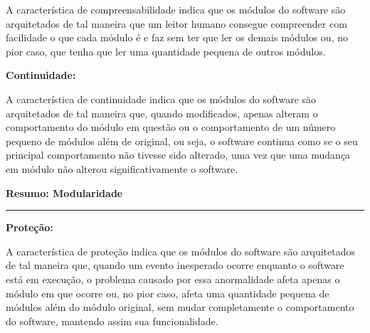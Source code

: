 \documentclass{article}
\begin{document}
\medskip

A característica de compreensabilidade indica que os módulos do software são arquitetados de tal maneira que um leitor humano consegue compreender com facilidade o que cada módulo é e faz sem ter que ler os demais módulos ou, no pior caso, que tenha que ler uma quantidade pequena de outros módulos.

\medskip

\textbf{Continuidade:}

\medskip

A característica de continuidade indica que os módulos do software são arquitetados de tal maneira que, quando modificados, apenas alteram o comportamento do módulo em questão ou o comportamento de um número pequeno de módulos além de original, ou seja, o software continua como se o seu principal comportamento não tivesse sido alterado, uma vez que uma mudança em módulo não alterou significativamente o software.

\pagebreak

\begin{center}

    \vspace*{-7mm}
    \textbf{\large{Resumo: Modularidade}}
    \vspace*{-4.5mm}

\end{center}

\noindent\rule{\textwidth}{0.5pt}

\bigskip

\textbf{Proteção:}

\medskip

A característica de proteção indica que os módulos do software são arquitetados de tal maneira que, quando um evento inesperado ocorre enquanto o software está em execução, o problema causado por essa anormalidade afeta apenas o módulo em que ocorre ou, no pior caso, afeta uma quantidade pequena de módulos além do módulo original, sem mudar completamente o comportamento do software, mantendo assim sua funcionalidade.
\end{document}
